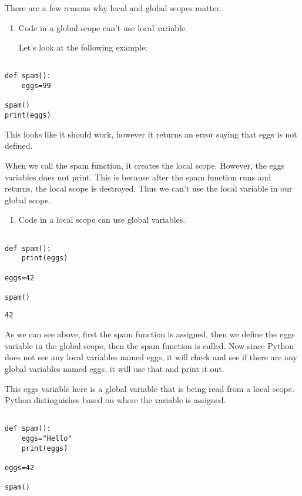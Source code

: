 \documentclass[11pt]{article}
\begin{document}
There are a few reasons why local and global scopes matter.

\begin{enumerate}
\item Code in a global scope can't use local variable.

Let's look at the following example:
\end{enumerate}

\begin{verbatim}

def spam():
    eggs=99

spam()
print(eggs)

\end{verbatim}

This looks like it should work, however it returns an error saying that eggs is not defined.

When we call the spam function, it creates the local scope. However, the eggs variables does not print. This is because after the spam function runs and returns, the local scope is destroyed. Thus we can't use the local variable in our global scope.


\begin{enumerate}
\item Code in a local scope can use global variables.
\end{enumerate}


\begin{verbatim}

def spam():
    print(eggs)

eggs=42
    
spam()

\end{verbatim}

\begin{verbatim}
42
\end{verbatim}


As we can see above, first the spam function is assigned, then we define the eggs variable in the global scope, then the spam function is called. Now since Python does not see any local variables named eggs, it will check and see if there are any global variables named eggs, it will use that and print it out.

This eggs variable here is a global variable that is being read from a local scope. Python distinguishes based on where the variable is assigned.


\begin{verbatim}

def spam():
    eggs="Hello"
    print(eggs)

eggs=42

spam()

\end{verbatim}
\end{document}
